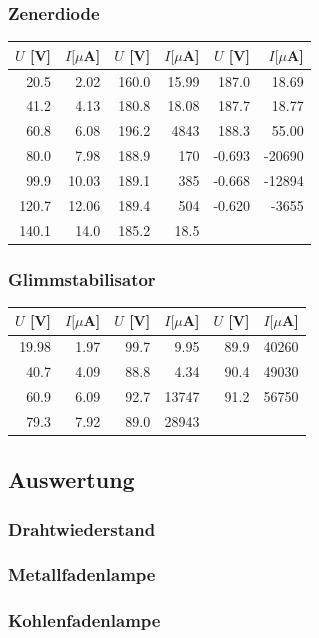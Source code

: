 \documentclass[12pt,a4paper]{article}
\begin{document}
\subsubsection*{Zenerdiode}
\begin{tabular}{|r|r|r|r|r|r|}
\hline
$U$ [V]&$I [\mu $A]&$U$ [V]&$I [\mu $A]&$U$ [V]&$I [\mu $A]\\
\hline
20.5&2.02&160.0&15.99&187.0&18.69\\
41.2&4.13&180.8&18.08&187.7&18.77\\
60.8&6.08&196.2&4843&188.3&55.00\\
80.0&7.98&188.9&170&-0.693&-20690\\
99.9&10.03&189.1&385&-0.668&-12894\\
120.7&12.06&189.4&504&-0.620&-3655\\
140.1&14.0&185.2&18.5&&\\
\hline
\end{tabular}

\subsubsection*{Glimmstabilisator}
\begin{tabular}{|r|r|r|r|r|r|}
\hline
$U$ [V]&$I [\mu $A]&$U$ [V]&$I [\mu $A]&$U$ [V]&$I [\mu $A]\\
\hline
19.98&1.97&99.7&9.95&89.9&40260\\
40.7&4.09&88.8&4.34&90.4&49030\\
60.9&6.09&92.7&13747&91.2&56750\\
79.3&7.92&89.0&28943&&\\
\hline
\end{tabular}

\subsection*{Auswertung}

\subsubsection*{Drahtwiederstand}

\subsubsection*{Metallfadenlampe}

\subsubsection*{Kohlenfadenlampe}
\end{document}
